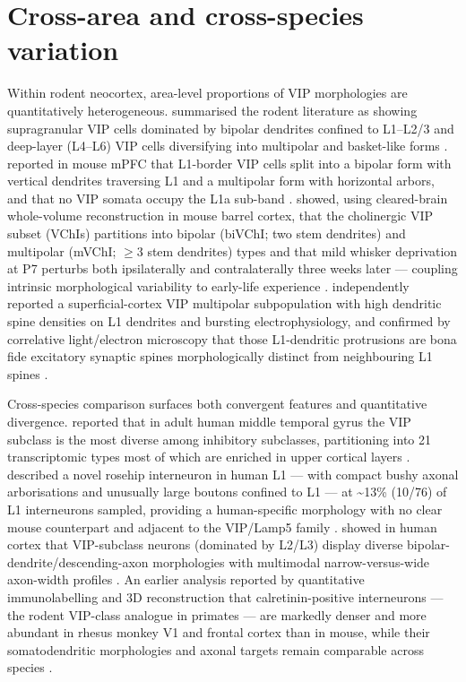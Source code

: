 \documentclass[11pt]{article}
\begin{document}
\section{Cross-area and cross-species variation}

Within rodent neocortex, area-level proportions of VIP morphologies are quantitatively heterogeneous. \citet{Apicella2022} summarised the rodent literature as showing supragranular VIP cells dominated by bipolar dendrites confined to L1--L2/3 and deep-layer (L4--L6) VIP cells diversifying into multipolar and basket-like forms \citep{Apicella2022, Pronneke2015, Zhou2017, Cauli2014}. \citet{Moreno2026} reported in mouse mPFC that L1-border VIP cells split into a bipolar form with vertical dendrites traversing L1 and a multipolar form with horizontal arbors, and that no VIP somata occupy the L1a sub-band \citep{Moreno2026, Apicella2022, Pronneke2015, Cauli2014}. \citet{Yayon2023} showed, using cleared-brain whole-volume reconstruction in mouse barrel cortex, that the cholinergic VIP subset (VChIs) partitions into bipolar (biVChI; two stem dendrites) and multipolar (mVChI; $\geq$3 stem dendrites) types and that mild whisker deprivation at P7 perturbs both ipsilaterally and contralaterally three weeks later --- coupling intrinsic morphological variability to early-life experience \citep{Yayon2023, Pronneke2015, Stachniak2021, Apicella2022}. \citet{Georgiou2022} independently reported a superficial-cortex VIP multipolar subpopulation with high dendritic spine densities on L1 dendrites and bursting electrophysiology, and confirmed by correlative light/electron microscopy that those L1-dendritic protrusions are bona fide excitatory synaptic spines morphologically distinct from neighbouring L1 spines \citep{Georgiou2022, Apicella2022, Pronneke2015, Demarcogarcia2011}.

Cross-species comparison surfaces both convergent features and quantitative divergence. \citet{Hodge2019} reported that in adult human middle temporal gyrus the VIP subclass is the most diverse among inhibitory subclasses, partitioning into 21 transcriptomic types most of which are enriched in upper cortical layers \citep{Hodge2019, Boldog2018, Lee2023a, Chartrand2023}. \citet{Boldog2018} described a novel rosehip interneuron in human L1 --- with compact bushy axonal arborisations and unusually large boutons confined to L1 --- at {\textasciitilde}13\% (10/76) of L1 interneurons sampled, providing a human-specific morphology with no clear mouse counterpart and adjacent to the VIP/Lamp5 family \citep{Boldog2018, Hodge2019, Chartrand2023, Lee2023a}. \citet{Lee2023a} showed in human cortex that VIP-subclass neurons (dominated by L2/L3) display diverse bipolar-dendrite/descending-axon morphologies with multimodal narrow-versus-wide axon-width profiles \citep{Lee2023a, Hodge2019, Chartrand2023, Pronneke2015}. An earlier analysis reported by quantitative immunolabelling and 3D reconstruction that calretinin-positive interneurons --- the rodent VIP-class analogue in primates --- are markedly denser and more abundant in rhesus monkey V1 and frontal cortex than in mouse, while their somatodendritic morphologies and axonal targets remain comparable across species \citep{Hodge2019, Cauli2014, Cauli1997}.
\end{document}
